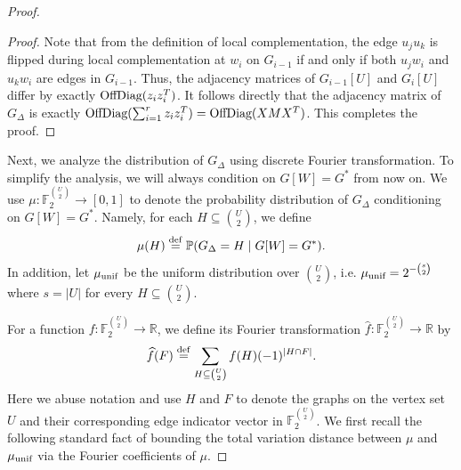 \documentclass[reqno]{amsart}
\theoremstyle{definition}
\numberwithin{theorem}{section}
\newcommand{\FF}{\mathbb F}
\newcommand{\RR}{\mathbb R}
\def\eqdef{\overset{\rm{def}}{=}}
\newcommand{\PP}{\mathbb P}
\newcommand{\abs}[1]{\left|#1\right|}
\newcommand{\F}{\mathbb{F}}
\newcommand{\OffDiag}{\textup{OffDiag}}
\begin{document}
\begin{proof}
\begin{proof}
        Note that from the definition of local complementation, the edge $u_ju_k$ is flipped during local complementation at $w_i$ on $G_{i-1}$ if and only if both $u_jw_i$ and $u_kw_i$ are edges in $G_{i-1}$. Thus, the adjacency matrices of $G_{i-1}[U]$ and $G_i[U]$ differ by exactly $\OffDiag(z_iz_i^T)$. It follows directly that the adjacency matrix of $G_{\Delta}$ is exactly $\OffDiag(\sum_{i=1}^rz_iz_i^T)=\OffDiag(XMX^T)$. This completes the proof.
    \end{proof}
    
    Next, we analyze the distribution of $G_{\Delta}$ using discrete Fourier transformation. To simplify the analysis, we will always condition on $G[W]=G^*$ from now on. We use $\mu:\FF_2^{\binom{U}{2}}\rightarrow [0,1]$ to denote the probability distribution of $G_{\Delta}$ conditioning on $G[W]=G^*$. Namely, for each $H\subseteq \binom{U}{2}$, we define
    \[\mu(H)\eqdef\PP(G_{\Delta}=H\mid G[W]=G^*).\]
    In addition, let $\mu_{\textup{unif}}$ be the uniform distribution over $\binom{U}{2}$, i.e. $\mu_{\textup{unif}}=2^{-\binom{s}{2}}$ where $s = |U|$ for every $H\subseteq \binom{U}{2}$.
    
    For a function $f:\FF_2^{\binom{U}{2}}\rightarrow \RR$, we define its Fourier transformation $\widehat{f}:\FF_2^{\binom{U}{2}}\rightarrow \RR$ by
    \[\widehat{f}(F)\eqdef\sum_{H\subseteq \binom{U}{2}}f(H)(-1)^{\abs{H\cap F}}.\] Here we abuse notation and use $H$ and $F$ to denote the graphs on the vertex set $U$ and their corresponding edge indicator vector in $\F_2^{\binom{U}{2}}$. We first recall the following standard fact of bounding the total variation distance between $\mu$ and $\mu_{\textup{unif}}$ via the Fourier coefficients of $\mu$.
    

\end{proof}
\end{document}
